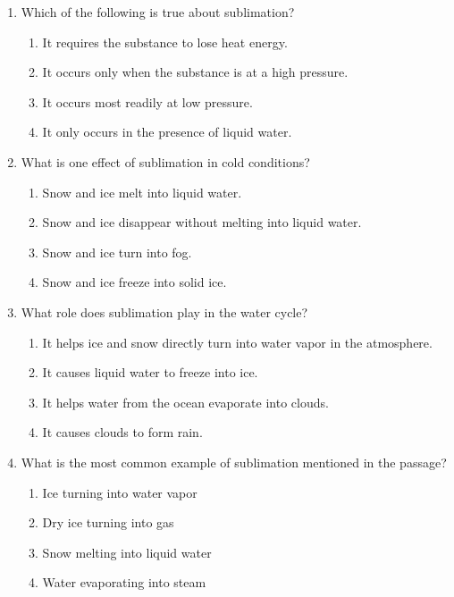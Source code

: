 \documentclass[12pt]{article}
\begin{document}
\begin{enumerate}
\vspace{0.5cm}

\item Which of the following is true about sublimation?
\begin{enumerate}[label=\Alph*.]
    \item It requires the substance to lose heat energy.
    \item It occurs only when the substance is at a high pressure.
    \item It occurs most readily at low pressure.
    \item It only occurs in the presence of liquid water.
\end{enumerate}

\vspace{0.5cm}

\item What is one effect of sublimation in cold conditions?
\begin{enumerate}[label=\Alph*.]
    \item Snow and ice melt into liquid water.
    \item Snow and ice disappear without melting into liquid water.
    \item Snow and ice turn into fog.
    \item Snow and ice freeze into solid ice.
\end{enumerate}

\vspace{0.5cm}

\item What role does sublimation play in the water cycle?
\begin{enumerate}[label=\Alph*.]
    \item It helps ice and snow directly turn into water vapor in the atmosphere.
    \item It causes liquid water to freeze into ice.
    \item It helps water from the ocean evaporate into clouds.
    \item It causes clouds to form rain.
\end{enumerate}

\vspace{0.5cm}

\item What is the most common example of sublimation mentioned in the passage?
\begin{enumerate}[label=\Alph*.]
    \item Ice turning into water vapor
    \item Dry ice turning into gas
    \item Snow melting into liquid water
    \item Water evaporating into steam
\end{enumerate}


\end{enumerate}
\end{document}
